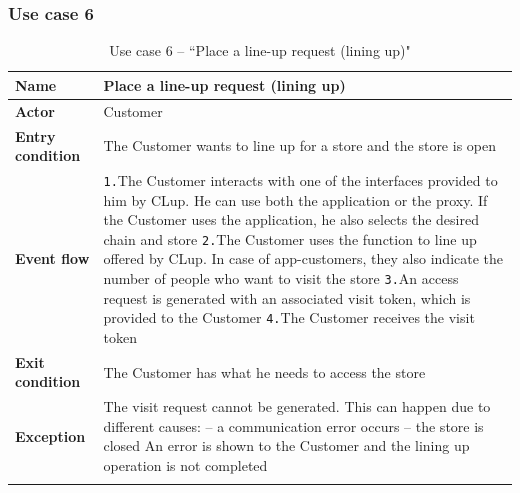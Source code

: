 \documentclass[a4paper,oneside,11pt]{book}   %
\begin{document}
    \subsubsection{Use case 6}
    \begin{longtable}[c] { |>{\bfseries{}}C{0.25\textwidth}|H{0.55\textwidth}| }
        \hline
        Name            & Place a line-up request (lining up) \\ \hline
        Actor           & Customer \\ \hline
        Entry condition & The Customer wants to line up for a store and the store is open \\ \hline
        Event flow      & 
        \texttt{1.}The Customer interacts with one of the interfaces provided to him by CLup. He can use both the application or the proxy. If the Customer uses the application, he also selects the desired chain and store \newline
        \texttt{2.}The Customer uses the function to line up offered by CLup. In case of app-customers, they also indicate the number of people who want to visit the store \newline
        \texttt{3.}An access request is generated with an associated visit token, which is provided to the Customer \newline 
        \texttt{4.}The Customer receives the visit token \\ \hline
        Exit condition  & The Customer has what he needs to access the store \\ \hline
        Exception       & The visit request cannot be generated. This can happen due to different causes: \newline
        -- a communication error occurs \newline
        -- the store is closed \newline
        An error is shown to the Customer and the lining up operation is not completed \\
        \hline
    \caption{Use case 6 -- ``Place a line-up request (lining up)"}
    \label{table:use_case_06}
    \end{longtable}
    
    \newpage
\end{document}
